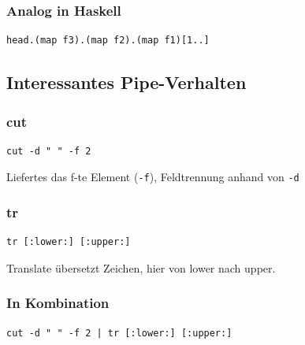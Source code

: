 		\subsubsection*{Analog in Haskell} %
		\label{ssub:analog_in_haskell}
		
			\lstHaskell
			\begin{lstlisting}
head.(map f3).(map f2).(map f1)[1..]
			\end{lstlisting}


		\subsection*{Interessantes Pipe-Verhalten} %
		\label{sub:interessantes_pipe_verhalten}
			
			\subsubsection*{cut} %
			\label{ssub:cut}

				\lstShell
				\begin{lstlisting}
cut -d " " -f 2
				\end{lstlisting}

				Liefertes das f-te Element (\texttt{-f}), Feldtrennung anhand von \texttt{-d}


			\subsubsection*{tr} %
			\label{ssub:tr}
			
				\lstShell
				\begin{lstlisting}
tr [:lower:] [:upper:]
				\end{lstlisting}

				Translate übersetzt Zeichen, hier von lower nach upper.


			\subsubsection*{In Kombination} %
			\label{ssub:in_kombination}
			
				\lstShell
				\begin{lstlisting}
cut -d " " -f 2 | tr [:lower:] [:upper:]
				\end{lstlisting}

